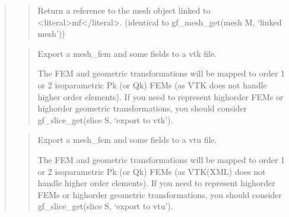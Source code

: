 \documentclass[a4paper,11pt,english]{sphinxmanual}
\begin{document}
\begin{quote}
\begin{quote}
\sphinxAtStartPar
Return a reference to the mesh object linked to \textless{}literal\textgreater{}mf\textless{}/literal\textgreater{}.
(identical to gf\_mesh\_get(mesh M, ‘linked mesh’))
\end{quote}

\sphinxAtStartPar
{}
\begin{quote}

\sphinxAtStartPar
Export a mesh\_fem and some fields to a vtk file.

\sphinxAtStartPar
The FEM and geometric transformations will be mapped to order 1
or 2 isoparametric Pk (or Qk) FEMs (as VTK does not handle higher
order elements). If you need to represent high\sphinxhyphen{}order FEMs or
high\sphinxhyphen{}order geometric transformations, you should consider
gf\_slice\_get(slice S, ‘export to vtk’).
\end{quote}

\sphinxAtStartPar
{}
\begin{quote}

\sphinxAtStartPar
Export a mesh\_fem and some fields to a vtu file.

\sphinxAtStartPar
The FEM and geometric transformations will be mapped to order 1
or 2 isoparametric Pk (or Qk) FEMs (as VTK(XML) does not handle higher
order elements). If you need to represent high\sphinxhyphen{}order FEMs or
high\sphinxhyphen{}order geometric transformations, you should consider
gf\_slice\_get(slice S, ‘export to vtu’).
\end{quote}

\sphinxAtStartPar
{}
\begin{quote}


\end{quote}
\end{quote}
\end{document}

